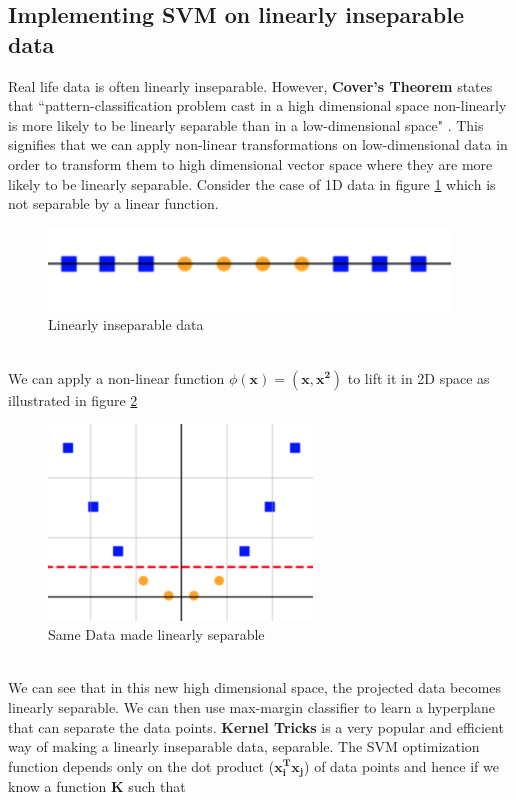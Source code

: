 \documentclass[11pt]{article}
\begin{document}
\subsection{Implementing SVM on linearly inseparable data}
Real life data is often linearly inseparable. However, \textbf{Cover's Theorem} states that ``pattern-classification problem cast in a high dimensional space non-linearly is more likely to be linearly separable than in a low-dimensional space" \cite{UWO_SVM_lecture}. This signifies that we can apply non-linear transformations on low-dimensional data in order to transform them to high dimensional vector space where they are more likely to be linearly separable. Consider the case of 1D data in figure \ref{fig:4} which is not separable by a linear function.
\begin{figure}[!h]
    \centering
    \vspace{-0.42cm}
    \includegraphics{images/Linear inseparable.png}
    \vspace{-1cm}
    \caption{Linearly inseparable data \cite{UWO_SVM_lecture}}
    \label{fig:4}
\end{figure}\\
We can apply a non-linear function $\phi(\mathbf{x}) = (\mathbf{x,x^2})$ to lift it in 2D space as illustrated in figure \ref{fig:5}
\begin{figure}[!h]
    \centering
    \includegraphics[width=7cm]{images/separable.png}
    \caption{Same Data made linearly separable\cite{UWO_SVM_lecture}}
    \label{fig:5}
\end{figure}\\
We can see that in this new high dimensional space, the projected data becomes linearly separable. We can then use max-margin classifier to learn a hyperplane that can separate the data points. \textbf{Kernel Tricks} is a very popular and efficient way of making a linearly inseparable data, separable. The SVM optimization function depends only on the dot product ($\mathbf{x_i^Tx_j}$) of data points and hence if we know a function $\mathbf{K}$ such that 
\end{document}

